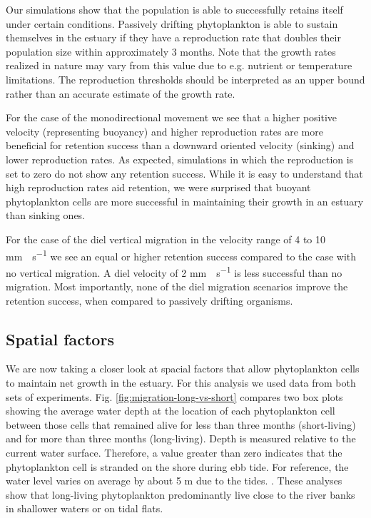 \documentclass[npg, manuscript]{copernicus}
\begin{document}
Our simulations show that the population is able to successfully retains itself under certain conditions.
Passively drifting phytoplankton is able to sustain themselves in the estuary if they have a reproduction rate that doubles their population size within approximately 3 months.
Note that the growth rates realized in nature may vary from this value due to e.g. nutrient or temperature limitations. The reproduction thresholds should be interpreted as an upper bound rather than an accurate estimate of the growth rate.

For the case of the monodirectional movement we see that a higher positive velocity (representing buoyancy) and higher reproduction rates are more beneficial for retention success than a downward oriented velocity (sinking) and lower reproduction rates.
As expected, simulations in which the reproduction is set to zero do not show any retention success.
While it is easy to understand that high reproduction rates aid retention, we were surprised that buoyant phytoplankton cells are more successful in maintaining their growth in an estuary than sinking ones.

For the case of the diel vertical migration in the velocity range of 4 to 10 \unit{mm\;s^{-1}} we see an equal or higher retention success compared to the case with no vertical migration.
A diel velocity of 2 \unit{mm\;s^{-1}} is less successful than no migration.
Most importantly, none of the diel migration scenarios improve the retention success, when compared to passively drifting organisms.


\subsection{Spatial factors}

We are now taking a closer look at spacial factors that allow phytoplankton cells to maintain net growth in the estuary. 
For this analysis we used data from both sets of experiments.
Fig. \ref{fig:migration-long-vs-short} compares two box plots showing the average water depth at the location of each phytoplankton cell between those cells that remained alive for less than three months (short-living) and for more than three months (long-living).
Depth is measured relative to the current water surface.
Therefore, a value greater than zero indicates that the phytoplankton cell is stranded on the shore during ebb tide.
For reference, the water level varies on average by about 5 \unit{m} due to the tides. \citep{Stanev2019, Schol2014}.
These analyses show that long-living phytoplankton predominantly live close to the river banks in shallower waters or on tidal flats.
\end{document}

